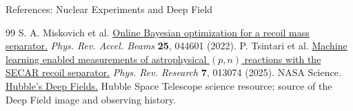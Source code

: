 \setsource{}
\begin{frame}[c,label=references-experiments]{References: Nuclear Experiments and Deep Field}
\footnotesize
\begin{thebibliography}{99}
\setlength{\itemsep}{1.5em}
S. A. Miskovich et al.
\href{https://doi.org/10.1103/PhysRevAccelBeams.25.044601}{Online Bayesian
optimization for a recoil mass separator.}
\textit{Phys. Rev. Accel. Beams} \textbf{25}, 044601 (2022).
P. Tsintari et al.
\href{https://doi.org/10.1103/PhysRevResearch.7.013074}{Machine learning
enabled measurements of astrophysical $(p,n)$ reactions with the SECAR
recoil separator.}
\textit{Phys. Rev. Research} \textbf{7}, 013074 (2025).
NASA Science.
\href{https://science.nasa.gov/mission/hubble/science/universe-uncovered/hubble-deep-fields/}{Hubble's Deep Fields.}
Hubble Space Telescope science resource; source of the Deep Field image
and observing history.
\end{thebibliography}
\end{frame}


